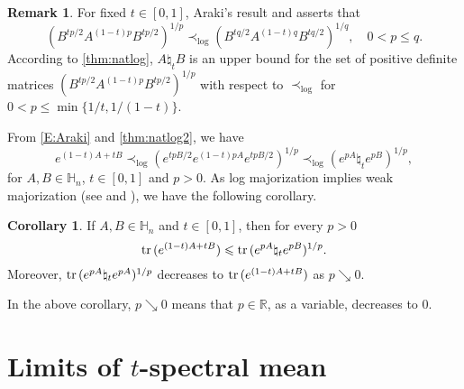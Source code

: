 \documentclass[12pt, reqno]{amsart}
\numberwithin{equation}{section}
\theoremstyle{definition}
\newtheorem{corollary}[theorem]{Corollary}
\newtheorem{remark}[theorem]{Remark}
\renewcommand{\le}{\leqslant}
\def\R{\mathbb R}
\def\H{\mathbb H}
\def\tr{{\rm tr\,}}
\begin{document}
\begin{remark}\label{R:Araki}
For fixed $t\in [0,1]$,  Araki's result \cite {A90} and \cite [Theorem A]{AH94} asserts that
\[
\left(B^{tp/2}A^{(1-t)p}B^{tp/2} \right)^{1/p} \prec_{\log} \left(B^{tq/2}A^{(1-t)q}B^{tq/2} \right)^{1/q},\quad 0<p\le q.
\]
According to  \eqref {thm:natlog}, $A \natural_t B$ is an upper bound for the set of positive definite matrices $\left(B^{tp/2}A^{(1-t)p}B^{tp/2} \right)^{1/p}$ with respect to $\prec_{\log}$ for $0<p\le \min\{1/t, 1/(1-t)\}$. 
\end{remark}

From \eqref{E:Araki} and \eqref{thm:natlog2}, we have 
\begin{equation}\label{eqn:chain2}
	e^{(1-t)A + tB} \prec_{\log} \left(e^{tpB/2}e^{(1-t)pA}e^{tpB/2} \right)^{1/p}\prec_{\log} (e^{pA} \natural_t e^{pB})^{1/p},
\end{equation}
for $A, B\in \H_n$, $t\in [0, 1]$ and $p> 0$. As log majorization implies weak majorization (see \cite [p.42]{A94} and \cite [p.168]{MOA11}), we have the following corollary.


\begin{corollary}
If $A,B\in \H_n$ and $t\in [0,1]$, then for every $p> 0$
\[
\tr (e^{(1-t)A + tB}) \le \tr (e^{pA}\natural_t e^{pB})^{1/p}.
\]
Moreover, $\tr{(e^{pA}\natural_t e^{pA})^{1/p}}$ decreases to $\tr{(e^{(1-t)A + tB})}$ as $p\searrow 0$.
\end{corollary}

In the above corollary, $p\searrow 0$ means that $p\in \R$, as a variable, decreases to $0$.


\section{Limits of $t$-spectral mean}
\end{document}
